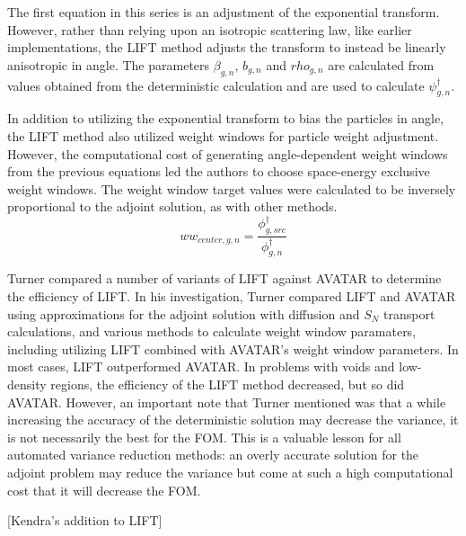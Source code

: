 The first equation in this series is an adjustment of the exponential transform. However,
rather than relying upon an isotropic scattering law, like earlier implementations, the LIFT
method adjusts the transform to instead be linearly anisotropic in angle. The parameters
$\beta_{g,n}$, $b_{g,n}$ and $rho_{g,n}$ are calculated from values obtained from the
deterministic calculation and are used to calculate $\psi^{\dagger}_{g,n}$.

In addition to utilizing the exponential transform to bias the particles in angle, the LIFT
method also utilized weight windows for particle weight adjustment. However, the computational
cost of generating angle-dependent weight windows from the previous equations led the authors
to choose space-energy exclusive weight windows. The weight window target values were
calculated to be inversely proportional to the adjoint solution, as with other methods.
\begin{equation}
ww_{center,g,n} = \frac{\phi^{\dagger}_{g,src}}{\phi^{\dagger}_{g,n}}
\end{equation}

Turner compared a number of variants of LIFT \cite{turner_automatic_1997-1} against AVATAR to
determine the efficiency of LIFT. In his investigation, Turner compared LIFT and AVATAR using
approximations for the adjoint solution with diffusion and $S_N$ transport calculations, and
various methods to calculate weight window paramaters, including utilizing LIFT combined
with AVATAR's weight window parameters. In most cases, LIFT outperformed AVATAR. In problems
with voids and low-density regions, the efficiency of the LIFT method decreased, but so did
AVATAR. However, an important note that Turner mentioned was that a while increasing the
accuracy of the deterministic solution may decrease the variance, it is not necessarily the
best for the FOM. This is a valuable lesson for all automated variance reduction methods: an
overly accurate solution for the adjoint problem may reduce the variance but come at such
a high computational cost that it will decrease the FOM.

[Kendra's addition to LIFT]

